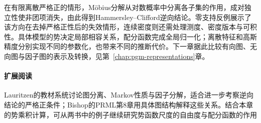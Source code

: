在有限离散严格正的情形，Möbius分解从对数概率中分离各子集的作用，成对独立性使非团项消失，由此得到Hammersley--Clifford逆向结论。零支持反例展示了该方向在去掉严格正性后的失效情形，连续密度则还需处理测度、密度版本与可积性。具体模型的势决定局部相容关系，配分函数完成全局归一化；离散特征和高斯精度分别实现不同的参数化，也带来不同的推断代价。下一章据此比较有向图、无向图与因子图的表示及转换，见第~\ref{chap:pgm-representations}章。

\paragraph{扩展阅读}
Lauritzen的教材系统讨论图分离、Markov性质与因子分解，适合进一步考察逆向结论的严格正条件；Bishop的PRML第8章用具体图结构解释这些关系。结合本章的势乘积计算，可从两书中的例子继续研究势函数尺度的自由度与配分函数的作用
